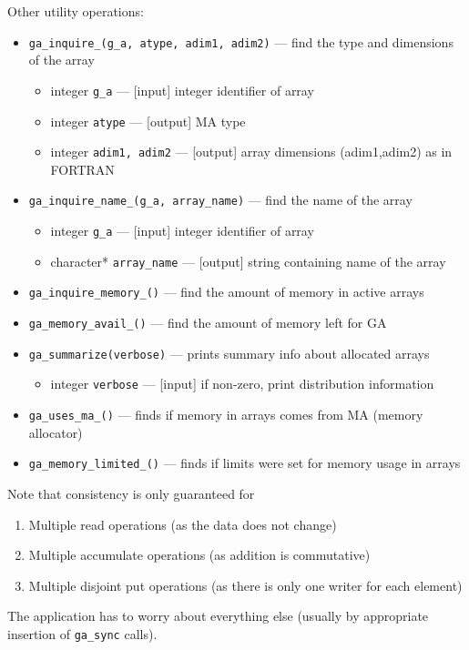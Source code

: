 Other utility operations:
\begin{itemize}
\item {\tt ga\_inquire\_(g\_a, atype, adim1, adim2)} --- find the type and 
                    dimensions of the array
\begin{itemize}
\item     integer {\tt g\_a}        --- [input] integer identifier of array
\item     integer {\tt atype}       --- [output] MA type
\item     integer {\tt adim1, adim2} --- [output] array dimensions (adim1,adim2) as in FORTRAN
\end{itemize}

\item {\tt ga\_inquire\_name\_(g\_a, array\_name)} --- find the name of the array
\begin{itemize}
\item     integer {\tt g\_a}         --- [input] integer identifier of array
\item     character* {\tt array\_name}  --- [output] string containing name of the array
\end{itemize}

\item {\tt ga\_inquire\_memory\_()} --- find the amount of memory in
  active arrays
\item {\tt ga\_memory\_avail\_()} --- find the amount of memory left for
  GA
\item {\tt ga\_summarize(verbose)} --- prints summary info about allocated
  arrays
\begin{itemize}
\item     integer {\tt verbose}     --- [input] if non-zero, print distribution information
\end{itemize}

\item {\tt ga\_uses\_ma\_()} --- finds if memory in arrays comes from MA
  (memory allocator)
\item {\tt ga\_memory\_limited\_()} --- finds if limits were set for
  memory usage in arrays
\end{itemize}

Note that consistency is only guaranteed for
\begin{enumerate}
\item Multiple read operations (as the data does not change)
\item Multiple accumulate operations (as addition is commutative)
\item Multiple disjoint put operations (as there is only one writer
  for each element)
\end{enumerate}
The application has to worry about everything else (usually by
appropriate insertion of {\tt ga\_sync} calls).

